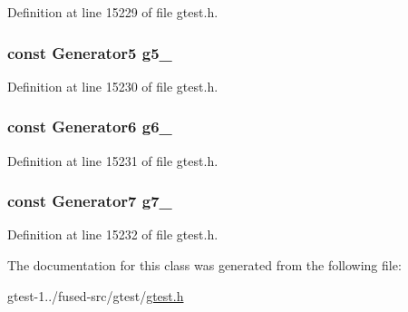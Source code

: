 \-Definition at line 15229 of file gtest.\-h.

\hypertarget{classtesting_1_1internal_1_1CartesianProductHolder7_ac153ca256cc6aabca132e9276e0b7e80}{
\subsubsection[{g5\-\_\-}]{\setlength{\rightskip}{0pt plus 5cm}const \-Generator5 {\bf g5\-\_\-}}}\label{d5/d88/classtesting_1_1internal_1_1CartesianProductHolder7_ac153ca256cc6aabca132e9276e0b7e80}


\-Definition at line 15230 of file gtest.\-h.

\hypertarget{classtesting_1_1internal_1_1CartesianProductHolder7_ac5367ac6ea4b99933483d6181bace5c2}{
\subsubsection[{g6\-\_\-}]{\setlength{\rightskip}{0pt plus 5cm}const \-Generator6 {\bf g6\-\_\-}}}\label{d5/d88/classtesting_1_1internal_1_1CartesianProductHolder7_ac5367ac6ea4b99933483d6181bace5c2}


\-Definition at line 15231 of file gtest.\-h.

\hypertarget{classtesting_1_1internal_1_1CartesianProductHolder7_afceade55d34273936f6cb3d7e4833d1b}{
\subsubsection[{g7\-\_\-}]{\setlength{\rightskip}{0pt plus 5cm}const \-Generator7 {\bf g7\-\_\-}}}\label{d5/d88/classtesting_1_1internal_1_1CartesianProductHolder7_afceade55d34273936f6cb3d7e4833d1b}


\-Definition at line 15232 of file gtest.\-h.



\-The documentation for this class was generated from the following file\-:\begin{DoxyCompactItemize}
\item 
gtest-\/1../fused-\/src/gtest/\hyperlink{fused-src_2gtest_2gtest_8h}{gtest.\-h}\end{DoxyCompactItemize}
